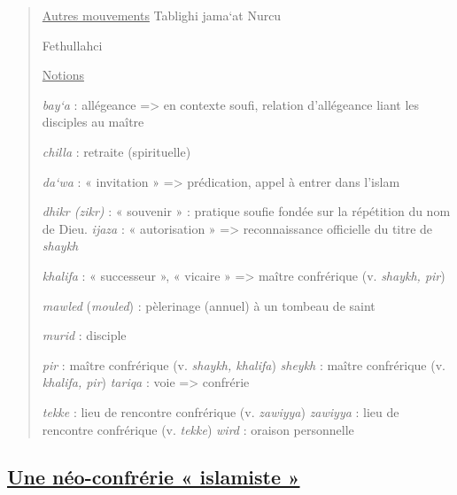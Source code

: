\begin{quote}
\underline{Autres mouvements} Tablighi jama`at Nurcu

Fethullahci

\underline{Notions}

\emph{bay`a} : allégeance =\textgreater{} en contexte soufi, relation
d'allégeance liant les disciples au maître

\emph{chilla} : retraite (spirituelle)

\emph{da`wa} : « invitation » =\textgreater{} prédication, appel à
entrer dans l'islam

\emph{dhikr (zikr)} : « souvenir » : pratique soufie fondée sur la
répétition du nom de Dieu. \emph{ijaza} : « autorisation »
=\textgreater{} reconnaissance officielle du titre de \emph{shaykh}

\emph{khalifa} : « successeur », « vicaire » =\textgreater{} maître
confrérique (v. \emph{shaykh, pir})

\emph{mawled} (\emph{mouled}) : pèlerinage (annuel) à un tombeau de
saint

\emph{murid} : disciple

\emph{pir} : maître confrérique (v. \emph{shaykh, khalifa})
\emph{sheykh} : maître confrérique (v. \emph{khalifa, pir})
\emph{tariqa} : voie =\textgreater{} confrérie

\emph{tekke} : lieu de rencontre confrérique (v. \emph{zawiyya})
\emph{zawiyya} : lieu de rencontre confrérique (v. \emph{tekke})
\emph{wird} : oraison personnelle
\end{quote}

\hypertarget{une-nuxe9o-confruxe9rie-islamiste}{%
\subsection{\texorpdfstring{\underline{Une néo-confrérie « islamiste
»}}{Une néo-confrérie « islamiste »}}\label{une-nuxe9o-confruxe9rie-islamiste}}

